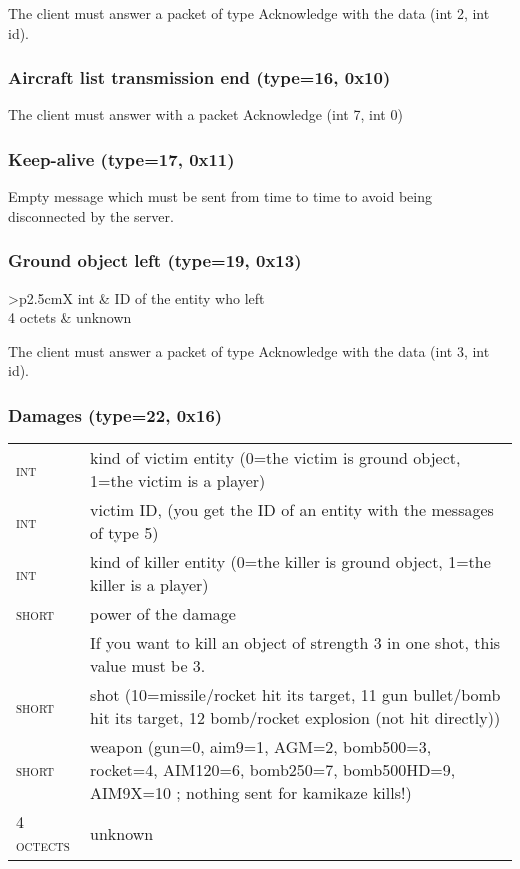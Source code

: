 \documentclass{article}
\newcommand{\gray}{\rowcolor[gray]{.92}}
\begin{document}
\vspace{0.2cm}
The client must answer a packet of type Acknowledge with the data (int 2, int id).

\vspace{0.4cm}
\subsubsection{Aircraft list transmission end (type=16, 0x10)}
The client must answer with a packet Acknowledge (int 7, int 0)

\vspace{0.4cm}
\subsubsection{Keep-alive (type=17, 0x11)}
Empty message which must be sent from time to time to avoid being disconnected by the server.

\vspace{0.4cm}
\subsubsection{Ground object left (type=19, 0x13)}
\begin{tabularx}{\linewidth}{>{\raggedleft\scshape\small}p{2.5cm}X}
int & ID of the entity who left\\
\gray 4 octets & unknown\\
\end{tabularx}

\vspace{0.2cm}
The client must answer a packet of type Acknowledge with the data (int 3, int id).


\vspace{0.4cm}
\subsubsection{Damages (type=22, 0x16)}

\begin{tabularx}{\linewidth}{>{\raggedleft\scshape\small}p{2.5cm}X}
 int & kind of victim entity (0=the victim is ground object, 1=the victim is a player)\\
\gray int & victim ID, (you get the ID of an entity with the messages of type 5)\\
 int & kind of killer entity (0=the killer is ground object, 1=the killer is a player)\\
\gray short & power of the damage\\
 & If you want to kill an object of strength 3 in one shot, this value must be 3.\\
 short & shot (10=missile/rocket hit its target, 11 gun bullet/bomb hit its target, 12 bomb/rocket explosion (not hit directly))\\
\gray short & weapon (gun=0, aim9=1, AGM=2, bomb500=3, rocket=4, AIM120=6, bomb250=7, bomb500HD=9, AIM9X=10 ; nothing sent for kamikaze kills!)\\
 4 octects & unknown\\
\end{tabularx}
\vspace{0.2cm}
\end{document}
